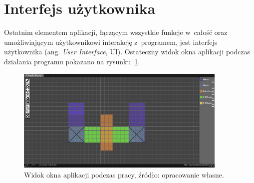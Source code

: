 \section{Interfejs użytkownika}
\label{sec:interfejs_uzytkownika}

Ostatnim elementem aplikacji,
łączącym wszystkie funkcje w~całość oraz umożliwiającym użytkownikowi interakcję z~programem,
jest interfejs użytkownika (ang. \textit{User Interface}, UI).
Ostateczny widok okna aplikacji podczas działania programu pokazano na rysunku~\ref{fig:ui_final}.

\begin{figure}[H]
    \centering
    \includegraphics[width=0.9\textwidth]{chapters/chapter4/rys/final_ui}
    \caption[Widok okna aplikacji podczas pracy.]
    {Widok okna aplikacji podczas pracy, źródło: opracowanie własne.}
    \label{fig:ui_final}
\end{figure}

